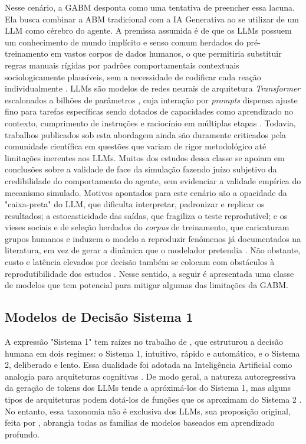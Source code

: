\documentclass[12pt,oneside,a4paper,brazil,sumario=tradicional]{abntex2}
\begin{document}
Nesse cenário, a GABM desponta como uma tentativa de preencher essa lacuna. Ela busca combinar a ABM tradicional com a IA Generativa ao se utilizar de um LLM como cérebro do agente. A premissa assumida é de que os LLMs possuem um conhecimento de mundo implícito e senso comum herdados do pré-treinamento em vastos corpos de dados humanos, o que permitiria substituir regras manuais rígidas por padrões comportamentais contextuais sociologicamente plausíveis, sem a necessidade de codificar cada reação individualmente \parencite{xi2023, wang2023, adornetto2025, ghaffarzadegan2024}. LLMs são modelos de redes neurais de arquitetura \textit{Transformer} escalonados a bilhões de parâmetros \parencite{vaswani2017, zhao2023}, cuja interação por \textit{prompts} dispensa ajuste fino para tarefas específicas sendo dotados de capacidades como aprendizado no contexto, cumprimento de instruções e raciocínio em múltiplas etapas \parencite{wei2022, zhao2023}.
Todavia, trabalhos publicados sob esta abordagem ainda são duramente criticados pela comunidade científica em questões que variam de rigor metodológico até limitações inerentes aos LLMs. Muitos dos estudos dessa classe se apoiam em conclusões sobre a validade de face da simulação fazendo juízo subjetivo da credibilidade do comportamento do agente, sem evidenciar a validade empírica do mecanismo simulado. Motivos apontados para este cenário são a opacidade da "caixa-preta" do LLM, que dificulta interpretar, padronizar e replicar os resultados; a estocasticidade das saídas, que fragiliza o teste reprodutível; e os vieses sociais e de seleção herdados do \textit{corpus} de treinamento, que caricaturam grupos humanos e induzem o modelo a reproduzir fenômenos já documentados na literatura, em vez de gerar a dinâmica que o modelador pretendia \parencite{larooij2025,taillandier2026}. Não obstante, custo e latência elevados por decisão também se colocam com obstáculos à reprodutibilidade dos estudos \parencite{chen2023}. Nesse sentido, a seguir é apresentada uma classe de modelos que tem potencial para mitigar algumas das limitações da GABM.

\subsection{Modelos de Decisão Sistema 1}

A expressão "Sistema 1" tem raízes no trabalho de \textcite{kahneman2003}, que estruturou a decisão humana em dois regimes: o Sistema 1, intuitivo, rápido e automático, e o Sistema 2, deliberado e lento. Essa dualidade foi adotada na Inteligência Artificial como analogia para arquiteturas cognitivas \parencite{bengio2019, booch2021, goyal2022}. De modo geral, a natureza autoregressiva da geração de tokens dos LLMs tende a apróximá-los do Sistema 1, mas alguns tipos de arquiteturas podem dotá-los de funções que os aproximam do Sistema 2 \parencite{booch2021, kambhampati2024, yao2023, sumers2024}. No entanto, essa taxonomia não é exclusiva dos LLMs, sua proposição original, feita por \textcite{bengio2019}, abrangia todas as famílias de modelos baseados em aprendizado profundo.
\end{document}
